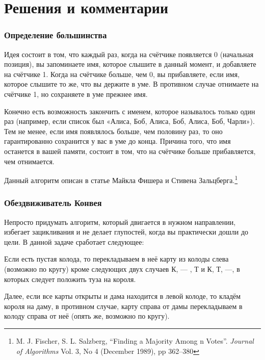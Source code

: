  \section*{Решения и комментарии}

\subsubsection*{Определение большинства}%

Идея состоит в том, что каждый раз, когда на счётчике появляется 0 (начальная позиция), 
вы запоминаете имя, которое слышите в данный момент, и добавляете на счётчике 1.
Когда на счётчике больше, чем 0, вы прибавляете, если имя, которое слышите то же, что вы держите в уме.
В противном случае отнимаете на счётчике 1, но сохраняете в уме прежнее имя.

Конечно есть возможность закончить с именем, которое называлось только один раз (например, если список был «Алиса, Боб, Алиса, Боб, Алиса, Боб, Чарли»).
Тем не менее, если имя появлялось больше, чем половину раз, то оно гарантированно сохранится у вас в уме до конца.
Причина того, что имя останется в вашей памяти, состоит в том, что на счётчике больше прибавляется, чем отнимается.

Данный алгоритм описан в статье Майкла Фишера и Стивена Зальцберга.\footnote{M. J. Fischer, S. L. Salzberg, ``Finding a Majority Among n Votes''. \emph{Journal of Algorithms} Vol. 3, No 4 (December 1989), pp 362--380}

\subsubsection*{Обездвиживатель Конвея}%

Непросто придумать алгоритм, который двигается в нужном направлении, избегает зацикливания и не делает глупостей, когда вы практически дошли до цели.
В данной задаче сработает следующее:

\medskip

Если есть пустая колода, то перекладываем в неё карту из колоды слева (возможно по кругу) кроме следующих двух случаев К, --- , Т и К, Т, ---, в которых следует положить туза на короля.

Далее, если все карты открыты и дама находится в левой колоде, то кладём короля на даму, в противном случае, карту справа от дамы перекладываем в колоду справа от неё (опять же, возможно по кругу).

